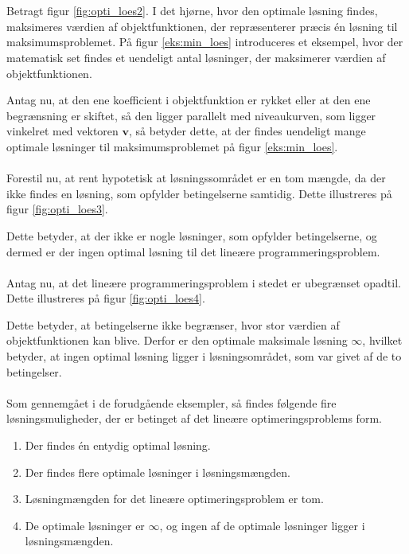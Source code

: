 \begin{eks}
\\\\
%
%
Betragt figur \ref{fig:opti_loes2}. 
I det hjørne, hvor den optimale løsning findes, maksimeres værdien af objektfunktionen, der repræsenterer præcis én løsning til maksimumsproblemet. 
På figur \ref{eks:min_loes} introduceres et eksempel, hvor der matematisk set findes et uendeligt antal løsninger, der
maksimerer værdien af objektfunktionen.
%

%
\noindent
Antag nu, at den ene koefficient i objektfunktion er rykket eller at den ene begrænsning er skiftet, så den ligger parallelt med niveaukurven, som ligger vinkelret med vektoren $\textbf{v}$, så betyder dette, at der findes uendeligt mange optimale løsninger til maksimumsproblemet på figur \ref{eks:min_loes}. 
\\\\
%
Forestil nu, at rent hypotetisk at løsningssområdet er en tom
mængde, da der ikke findes en løsning, som opfylder betingelserne samtidig. 
Dette illustreres på figur \ref{fig:opti_loes3}.
%

%
\noindent
Dette betyder, at der ikke er nogle løsninger, som opfylder betingelserne, og dermed er der ingen optimal løsning til det lineære programmeringsproblem. 
\\\\
%
Antag nu, at det lineære programmeringsproblem i stedet er ubegrænset opadtil.
Dette illustreres på figur \ref{fig:opti_loes4}.
%

%
\noindent
%
Dette betyder, at betingelserne ikke begrænser, hvor stor
værdien af objektfunktionen kan blive. 
Derfor er den optimale maksimale løsning $\infty$, hvilket betyder, at ingen optimal løsning ligger i løsningsområdet, som var givet af de to betingelser. 
\\\\
%
Som gennemgået i de forudgående eksempler, så findes følgende fire løsningsmuligheder, der er betinget af det lineære optimeringsproblems form.
%
\begin{enumerate}
\item Der findes én entydig optimal løsning.
\item Der findes flere optimale løsninger i løsningsmængden.
\item Løsningmængden for det lineære optimeringsproblem er tom. 
\item De optimale løsninger er $\infty$, og ingen af de optimale løsninger ligger i løsningsmængden.
\end{enumerate}
%
\end{eks}